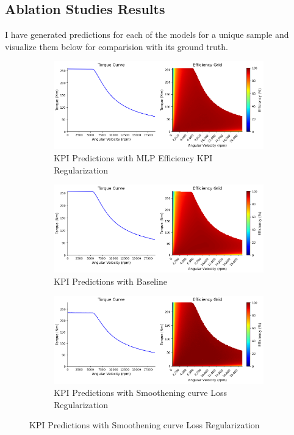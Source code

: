 \documentclass{report} %
\begin{document}
\subsection{Ablation Studies Results}
\label{subsec:Ablation Studies Results}
I have generated predictions for each of the models for a unique sample and visualize them below for comparision with its ground truth.
\begin{figure}[H]
    \centering
    \begin{subfigure}{1\textwidth}
        \centering
        \includegraphics[width=1\textwidth]{./ReportImages/predictions.png} 
        \caption{KPI Predictions with MLP Efficiency KPI Regularization} 
        \label{KPI_Predictions_with_MLP_Efficiency}
    \end{subfigure}\hfill
    \begin{subfigure}{1\textwidth}
        \centering
        \includegraphics[width=1\textwidth]{./ReportImages/predictions_Baseline.png} 
        \caption{KPI Predictions with Baseline} 
        \label{KPI_Predictions_with_Baseline}
    \end{subfigure}\hfill
    \begin{subfigure}{1\textwidth}
        \centering
        \includegraphics[width=1\textwidth]{./ReportImages/predictions_Smoothening.png} 
        \caption{KPI Predictions with Smoothening curve Loss Regularization} 
        \label{KPI_Predictions_with_Smoothening}
    \end{subfigure}\hfill
\end{figure}
\end{document}
